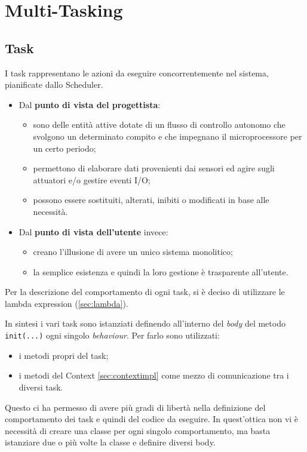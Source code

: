\chapter{Multi-Tasking}

\section{Task}
I task rappresentano le azioni da eseguire concorrentemente nel sistema, pianificate dallo Scheduler. 

\begin{itemize}
	\item Dal \textbf{punto di vista del progettista}:
	\begin{itemize}
		\item sono delle entità attive dotate di un flusso di controllo autonomo che svolgono un determinato compito e che impegnano il microprocessore per un certo periodo;
		\item permettono di elaborare dati provenienti dai sensori ed agire sugli attuatori e/o gestire eventi I/O;
		\item possono essere sostituiti, alterati, inibiti o modificati in base alle necessità.
	\end{itemize}
	\item Dal \textbf{punto di vista dell'utente} invece:
	\begin{itemize}
		\item  creano l'illusione di avere un unico sistema monolitico;
		\item  la semplice esistenza e quindi la loro gestione è trasparente all'utente.
	\end{itemize}
\end{itemize}
Per la descrizione del comportamento di ogni task, si è deciso di utilizzare le lambda expression (\ref{sec:lambda}). 

In sintesi i vari task sono istanziati definendo all'interno del \textit{body} del metodo \texttt{init(...)} ogni singolo \textit{behaviour}. Per farlo sono utilizzati: 
\begin{itemize}
	\item i metodi propri del task;
	\item i metodi del Context \ref{sec:contextimpl} come mezzo di comunicazione tra i diversi task.
\end{itemize}
Questo ci ha permesso di avere più gradi di libertà nella definizione del comportamento dei task e quindi del codice da eseguire. In quest'ottica non vi è necessità di creare una classe per ogni singolo comportamento, ma basta istanziare due o più volte la classe e definire diversi body.

